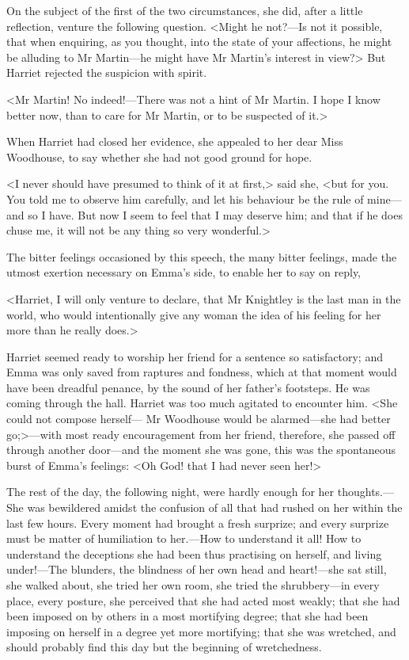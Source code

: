 On the subject of the first of the two circumstances, she did, after a little reflection, venture the following question. <Might he not?—Is not it possible, that when enquiring, as you thought, into the state of your affections, he might be alluding to Mr Martin—he might have Mr Martin's interest in view?> But Harriet rejected the suspicion with spirit.

<Mr Martin! No indeed!—There was not a hint of Mr Martin. I hope I know better now, than to care for Mr Martin, or to be suspected of it.>

When Harriet had closed her evidence, she appealed to her dear Miss Woodhouse, to say whether she had not good ground for hope.

<I never should have presumed to think of it at first,> said she, <but for you. You told me to observe him carefully, and let his behaviour be the rule of mine—and so I have. But now I seem to feel that I may deserve him; and that if he does chuse me, it will not be any thing so very wonderful.>

The bitter feelings occasioned by this speech, the many bitter feelings, made the utmost exertion necessary on Emma's side, to enable her to say on reply,

<Harriet, I will only venture to declare, that Mr Knightley is the last man in the world, who would intentionally give any woman the idea of his feeling for her more than he really does.>

Harriet seemed ready to worship her friend for a sentence so satisfactory; and Emma was only saved from raptures and fondness, which at that moment would have been dreadful penance, by the sound of her father's footsteps. He was coming through the hall. Harriet was too much agitated to encounter him. <She could not compose herself— Mr Woodhouse would be alarmed—she had better go;>—with most ready encouragement from her friend, therefore, she passed off through another door—and the moment she was gone, this was the spontaneous burst of Emma's feelings: <Oh God! that I had never seen her!>

The rest of the day, the following night, were hardly enough for her thoughts.—She was bewildered amidst the confusion of all that had rushed on her within the last few hours. Every moment had brought a fresh surprize; and every surprize must be matter of humiliation to her.—How to understand it all! How to understand the deceptions she had been thus practising on herself, and living under!—The blunders, the blindness of her own head and heart!—she sat still, she walked about, she tried her own room, she tried the shrubbery—in every place, every posture, she perceived that she had acted most weakly; that she had been imposed on by others in a most mortifying degree; that she had been imposing on herself in a degree yet more mortifying; that she was wretched, and should probably find this day but the beginning of wretchedness.

